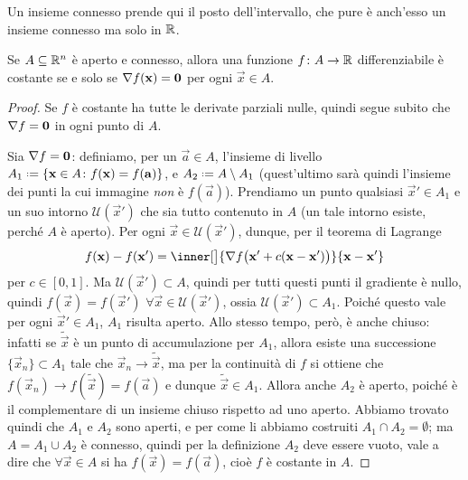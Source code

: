 Un insieme connesso prende qui il posto dell'intervallo, che pure è anch'esso un insieme connesso ma solo in $\mathbb{R}$.
\begin{corollario}
	Se $A\subseteq\mathbb{R}^n$ è aperto e connesso, allora una funzione $f\colon A\to\mathbb{R}$ differenziabile è costante se e solo se $\nabla f(\mathbf{x})=\mathbf{0}$ per ogni $\vec x\in A$.
\end{corollario}
\begin{proof}
	Se $f$ è costante ha tutte le derivate parziali nulle, quindi segue subito che $\nabla f=\mathbf{0}$ in ogni punto di $A$.

	Sia $\nabla f=\mathbf{0}$: definiamo, per un $\vec a\in A$, l'insieme di livello $A_1\defeq\{\vec x\in A\colon f(\vec x)=f(\vec a)\}$, e $A_2\defeq A\setminus A_1$ (quest'ultimo sarà quindi l'insieme dei punti la cui immagine \emph{non} è $f(\vec a)$).
	Prendiamo un punto qualsiasi $\vec x'\in A_1$ e un suo intorno $\mathcal U(\vec x')$ che sia tutto contenuto in $A$ (un tale intorno esiste, perch\'e $A$ è aperto).
	Per ogni $\vec x\in\mathcal U(\vec x')$, dunque, per il teorema di Lagrange
	\begin{equation*}
		f(\vec x)-f(\vec x')=\inner[\big]{\grad f\big(\vec x'+c(\vec x-\vec x')\big)}{\vec x-\vec x'}
	\end{equation*}
	per $c\in[0,1]$.
	Ma $\mathcal U(\vec x')\subset A$, quindi per tutti questi punti il gradiente è nullo, quindi $f(\vec x)=f(\vec x')$ $\forall\vec x\in\mathcal U(\vec x')$, ossia $\mathcal U(\vec x')\subset A_1$.
	Poich\'e questo vale per ogni $\vec x'\in A_1$, $A_1$ risulta aperto.
	Allo stesso tempo, però, è anche chiuso: infatti se $\tilde{\vec x}$ è un punto di accumulazione per $A_1$, allora esiste una successione $\{\vec x_n\}\subset A_1$ tale che $\vec x_n\to\tilde{\vec x}$, ma per la continuità di $f$ si ottiene che $f(\vec x_n)\to f(\tilde{\vec x})=f(\vec a)$ e dunque $\tilde{\vec x}\in A_1$.
	Allora anche $A_2$ è aperto, poich\'e è il complementare di un insieme chiuso rispetto ad uno aperto.
	Abbiamo trovato quindi che $A_1$ e $A_2$ sono aperti, e per come li abbiamo costruiti $A_1\cap A_2=\emptyset$; ma $A=A_1\cup A_2$ è connesso, quindi per la definizione $A_2$ deve essere vuoto, vale a dire che $\forall \vec x\in A$ si ha $f(\vec x)=f(\vec a)$, cioè $f$ è costante in $A$.
\end{proof}

